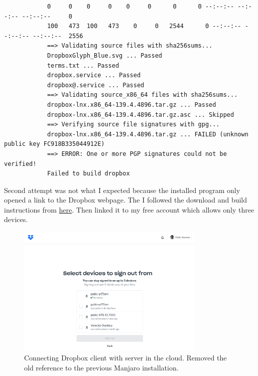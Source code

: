 \documentclass[]{scrartcl}
\begin{document}
\begin{small}
\begin{verbatim}
			0     0    0     0    0     0      0      0 --:--:-- --:--:-- --:--:--     0
			100   473  100   473    0     0   2544      0 --:--:-- --:--:-- --:--:--  2556
			==> Validating source files with sha256sums...
			DropboxGlyph_Blue.svg ... Passed
			terms.txt ... Passed
			dropbox.service ... Passed
			dropbox@.service ... Passed
			==> Validating source_x86_64 files with sha256sums...
			dropbox-lnx.x86_64-139.4.4896.tar.gz ... Passed
			dropbox-lnx.x86_64-139.4.4896.tar.gz.asc ... Skipped
			==> Verifying source file signatures with gpg...
			dropbox-lnx.x86_64-139.4.4896.tar.gz ... FAILED (unknown public key FC918B335044912E)
			==> ERROR: One or more PGP signatures could not be verified!
			Failed to build dropbox
		\end{verbatim}
	\end{small}
	
	Second attempt was not what I expected because the installed program only opened a link to the Dropbox webpage.
	The I followed the download and build instructions from \href{https://help.dropbox.com/installs-integrations/desktop/linux-commands}{here}. 
	Then linked it to my free account which allows only three devices.
	
	\begin{figure}[!htb]
		\centering
		\caption{Connecting Dropbox client with server in the cloud. Removed the old reference to the previous Manjaro installation.}
		\includegraphics[width=0.8\textwidth]{Images/DropBoxSetUp.png}
	\end{figure}
	
	
	
\end{document}
